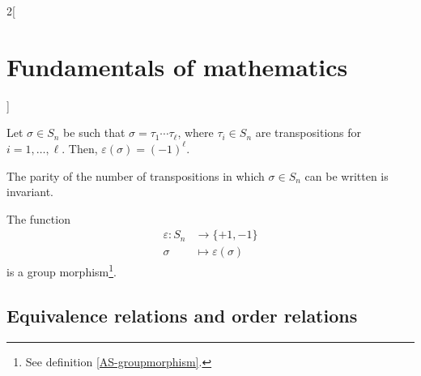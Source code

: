 \documentclass[../../../main.tex]{subfiles}
\begin{document}
\begin{multicols}{2}[\section{Fundamentals of mathematics}]
\begin{theorem}
  \end{theorem}
  \begin{corollary}
    Let $\sigma\in S_n$ be such that $\sigma=\tau_1\cdots\tau_\ell$, where $\tau_i\in S_n$ are transpositions for $i=1,\ldots,\ell$. Then, $\varepsilon(\sigma)=(-1)^\ell$.
  \end{corollary}
  \begin{corollary}
    The parity of the number of transpositions in which $\sigma\in S_n$ can be written is invariant.
  \end{corollary}
  \begin{corollary}
    The function
    \begin{align*}
      \varepsilon:S_n & \longrightarrow\{+1,-1\}       \\
      \sigma          & \longmapsto\varepsilon(\sigma)
    \end{align*}
    is a group morphism\footnote{See definition \ref{AS-groupmorphism}.}.
  \end{corollary}
  \subsection{Equivalence relations and order relations}

\end{multicols}
\end{document}
